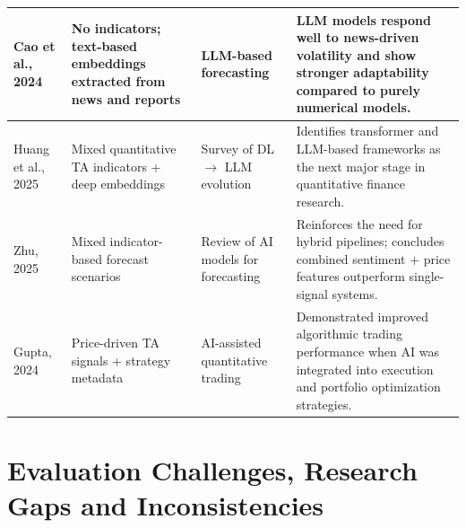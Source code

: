 \begin{small}
\begin{longtable}{|p{2.0cm}|p{3.3cm}|p{2.8cm}|p{4.2cm}|}
Cao et al., 2024 \cite{Cao2024LLMStock} &
No indicators; text-based embeddings extracted from news and reports &
LLM-based forecasting &
LLM models respond well to news-driven volatility and show stronger adaptability compared to purely numerical models. \\ \hline

Huang et al., 2025 \cite{Huang2025DeepLearning} &
Mixed quantitative TA indicators + deep embeddings &
Survey of DL $\rightarrow$ LLM evolution &
Identifies transformer and LLM-based frameworks as the next major stage in quantitative finance research. \\ \hline

Zhu, 2025 \cite{Zhu2025StockPredictionReview} &
Mixed indicator-based forecast scenarios &
Review of AI models for forecasting &
Reinforces the need for hybrid pipelines; concludes combined sentiment + price features outperform single-signal systems. \\ \hline

Gupta, 2024 \cite{Gupta2024RoleOfAI} &
Price-driven TA signals + strategy metadata &
AI-assisted quantitative trading &
Demonstrated improved algorithmic trading performance when AI was integrated into execution and portfolio optimization strategies. \\ \hline

\end{longtable}
\end{small}

\FloatBarrier
\clearpage

\section{Evaluation Challenges, Research Gaps and Inconsistencies}


